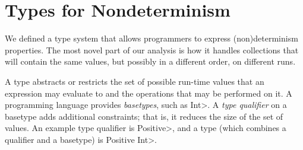 \section{Types for Nondeterminism\label{sec:approach}}

We defined a type system
that allows programmers to express (non)determinism properties.
The most novel part of our analysis is how it handles collections that will
contain the same values, but
possibly in a different order, on different runs.



A type abstracts or restricts the set of possible
run-time values that an expression may evaluate to and the operations that
may be performed on it.
A programming language provides \emph{basetypes}, such as \<Int>.
A \textit{type qualifier} on a basetype adds additional constraints;
that is, it reduces the size of the set of values.
An example type qualifier is \<Positive>, and a type (which combines a qualifier
and a basetype) is \<Positive Int>.

